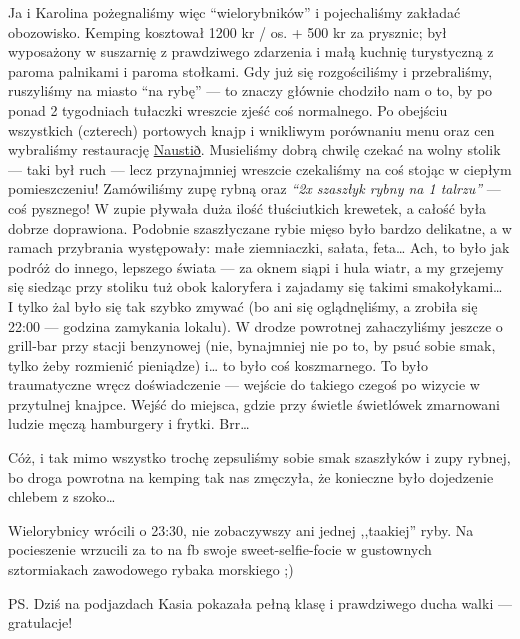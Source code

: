 
Ja i Karolina pożegnaliśmy więc “wielorybników” i pojechaliśmy zakładać obozowisko. Kemping kosztował 1200 kr / os. + 500 kr za prysznic; był wyposażony w suszarnię z prawdziwego zdarzenia i małą kuchnię turystyczną z paroma palnikami i paroma stołkami. Gdy już się rozgościliśmy i przebraliśmy, ruszyliśmy na miasto “na rybę” --- to znaczy głównie chodziło nam o to, by po ponad 2 tygodniach tułaczki wreszcie zjeść coś normalnego. Po obejściu wszystkich (czterech) portowych knajp i wnikliwym porównaniu menu oraz cen wybraliśmy restaurację \href{https://www.facebook.com/naustid}{Naustið}. Musieliśmy dobrą chwilę czekać na wolny stolik --- taki był ruch --- lecz przynajmniej wreszcie czekaliśmy na coś stojąc w ciepłym pomieszczeniu! Zamówiliśmy zupę rybną oraz \emph{“2x szaszłyk rybny na 1 talrzu”} --- coś pysznego! W zupie pływała duża ilość tłuściutkich krewetek, a całość była dobrze doprawiona. Podobnie szaszłyczane rybie mięso było bardzo delikatne, a w ramach przybrania występowały: małe ziemniaczki, sałata, feta… Ach, to było jak podróż do innego, lepszego świata --- za oknem siąpi i hula wiatr, a my grzejemy się siedząc przy stoliku tuż obok kaloryfera i zajadamy się takimi smakołykami… I tylko żal było się tak szybko zmywać (bo ani się oglądnęliśmy, a zrobiła się 22:00 --- godzina zamykania lokalu). W drodze powrotnej zahaczyliśmy jeszcze o grill-bar przy stacji benzynowej (nie, bynajmniej nie po to, by psuć sobie smak, tylko żeby rozmienić pieniądze) i… to było coś koszmarnego. To było traumatyczne wręcz doświadczenie --- wejście do takiego czegoś po wizycie w przytulnej knajpce. Wejść do miejsca, gdzie przy świetle świetlówek zmarnowani ludzie męczą hamburgery i frytki. Brr…


Cóż, i tak mimo wszystko trochę zepsuliśmy sobie smak szaszłyków i zupy rybnej, bo droga powrotna na kemping tak nas zmęczyła, że konieczne było dojedzenie chlebem z szoko…

Wielorybnicy wrócili o 23:30, nie zobaczywszy ani jednej ,,taakiej'' ryby. Na pocieszenie wrzucili za to na fb swoje sweet-selfie-focie w gustownych sztormiakach zawodowego rybaka morskiego ;)

PS. Dziś na podjazdach Kasia pokazała pełną klasę i prawdziwego ducha walki --- gratulacje!
